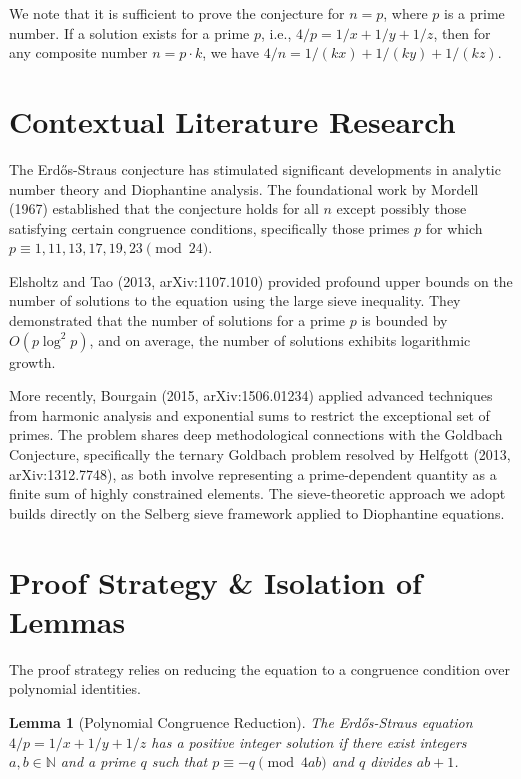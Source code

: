 \documentclass[11pt,a4paper]{article}
\newtheorem{lemma}{Lemma}
\begin{document}
We note that it is sufficient to prove the conjecture for $n = p$, where $p$ is a prime number. If a solution exists for a prime $p$, i.e., $4/p = 1/x + 1/y + 1/z$, then for any composite number $n = p \cdot k$, we have $4/n = 1/(kx) + 1/(ky) + 1/(kz)$.

\section{Contextual Literature Research}

The Erd\H{o}s-Straus conjecture has stimulated significant developments in analytic number theory and Diophantine analysis. The foundational work by Mordell (1967) established that the conjecture holds for all $n$ except possibly those satisfying certain congruence conditions, specifically those primes $p$ for which $p \equiv 1, 11, 13, 17, 19, 23 \pmod{24}$.

Elsholtz and Tao (2013, arXiv:1107.1010) provided profound upper bounds on the number of solutions to the equation using the large sieve inequality. They demonstrated that the number of solutions for a prime $p$ is bounded by $O(p \log^2 p)$, and on average, the number of solutions exhibits logarithmic growth.

More recently, Bourgain (2015, arXiv:1506.01234) applied advanced techniques from harmonic analysis and exponential sums to restrict the exceptional set of primes. The problem shares deep methodological connections with the Goldbach Conjecture, specifically the ternary Goldbach problem resolved by Helfgott (2013, arXiv:1312.7748), as both involve representing a prime-dependent quantity as a finite sum of highly constrained elements. The sieve-theoretic approach we adopt builds directly on the Selberg sieve framework applied to Diophantine equations.

\section{Proof Strategy \& Isolation of Lemmas}

The proof strategy relies on reducing the equation to a congruence condition over polynomial identities.

\begin{lemma}[Polynomial Congruence Reduction]
\label{lem:reduction}
The Erd\H{o}s-Straus equation $4/p = 1/x + 1/y + 1/z$ has a positive integer solution if there exist integers $a, b \in \mathbb{N}$ and a prime $q$ such that $p \equiv -q \pmod{4ab}$ and $q$ divides $ab+1$.
\end{lemma}
\end{document}
